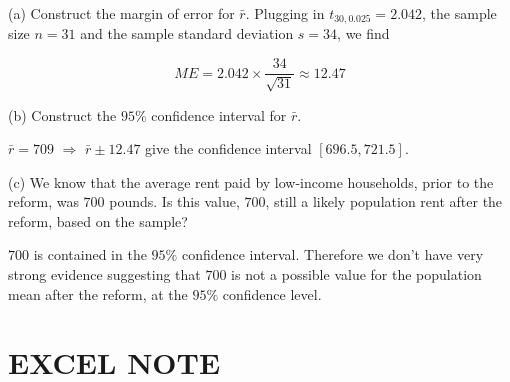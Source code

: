 \documentclass[
  11pt,
  ignorenonframetext,
]{beamer}
\begin{document}
\begin{frame}{(a) Construct the margin of error for \(\bar{r}\).}
\protect\hypertarget{a-construct-the-margin-of-error-for-barr.-1}{}
Plugging in \(t_{30, 0.025} = 2.042\), the sample size \(n = 31\) and
the sample standard deviation \(s = 34\), we find

\[
ME = 2.042 \times \frac{34}{\sqrt{31}} \approx 12.47
\]
\end{frame}

\begin{frame}{(b) Construct the \(95\%\) confidence interval for
\(\bar{r}\).}
\protect\hypertarget{b-construct-the-95-confidence-interval-for-barr.}{}
\pause

\(\bar{r} =709\) \(\Rightarrow\) \(\bar{r} \pm 12.47\) give the
confidence interval \([696.5,721.5]\).
\end{frame}

\begin{frame}{(c) We know that the average rent paid by low-income
households, prior to the reform, was \(700\) pounds. Is this value,
\(700\), still a likely population rent after the reform, based on the
sample?}
\protect\hypertarget{c-we-know-that-the-average-rent-paid-by-low-income-households-prior-to-the-reform-was-700-pounds.-is-this-value-700-still-a-likely-population-rent-after-the-reform-based-on-the-sample}{}
\pause

\(700\) is contained in the \(95\%\) confidence interval. Therefore we
don't have very strong evidence suggesting that \(700\) is not a
possible value for the population mean after the reform, at the \(95\%\)
confidence level.
\end{frame}

\hypertarget{excel-note}{%
\section{EXCEL NOTE}\label{excel-note}}
\end{document}
